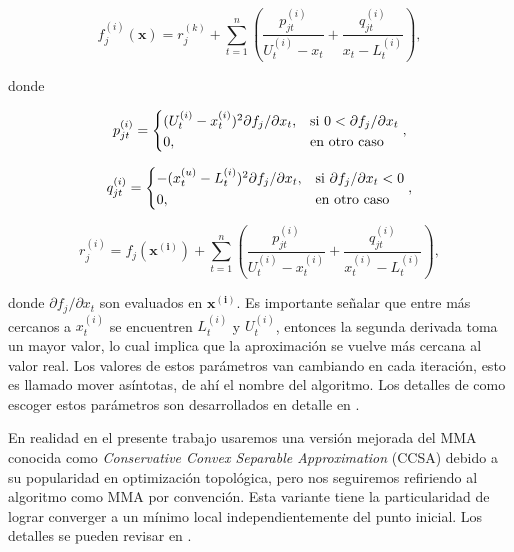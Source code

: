 \begin{equation}
  f_j^{(i)}(\boldsymbol{x}) = r_j^{(k)} + \displaystyle\sum_{t=1}^n\left(\frac{p_{jt}^{(i)}}{U_t^{(i)} - x_t}
  + \frac{q_{jt}^{(i)}}{x_t - L_t^{(i)}} \right),
\end{equation}

donde

\begin{equation}
  p_{jt}^{(i)} = \begin{cases*}
    (U_t^{(i)} - x_t^{(i)})^2 \partial f_j / \partial x_t, & si $0 < \partial f_j / \partial x_t$\\
    0, & en otro caso
  \end{cases*},
\end{equation}

\begin{equation}
  q_{jt}^{(i)} = \begin{cases*}
    -(x_t^{(u)} - L_t^{(i)})^2 \partial f_j / \partial x_t, & si $\partial f_j / \partial x_t < 0$\\
    0, & en otro caso
  \end{cases*},
\end{equation}


\begin{equation}
  r_j^{(i)} =  f_j(\boldsymbol{x^{(i)}}) + \displaystyle\sum_{t=1}^n\left(\frac{p_{jt}^{(i)}}{U_t^{(i)} - x_t^{(i)}}
  + \frac{q_{jt}^{(i)}}{x_t^{(i)} - L_t^{(i)}} \right),
\end{equation}

\noindent donde $\partial f_j / \partial x_t$ son evaluados en $\boldsymbol{x^{(i)}}$.
Es importante señalar que entre más cercanos a $x_t^{(i)}$ se encuentren $L_t^{(i)}$ y $U_t^{(i)}$,
entonces la segunda derivada toma un mayor valor, lo cual implica que la aproximación se vuelve más 
cercana al valor real. 
Los valores de estos parámetros van cambiando en cada iteración, esto es llamado mover asíntotas, de ahí el
nombre del algoritmo. Los detalles de como escoger estos parámetros son desarrollados en detalle
en \cite{Svanberg1987}.


En realidad en el presente trabajo usaremos una versión mejorada del MMA
conocida como \emph{Conservative Convex Separable Approximation} (CCSA) 
debido a su popularidad en optimización topológica, pero nos seguiremos refiriendo
al algoritmo como MMA por convención.
Esta variante tiene la particularidad de lograr converger a un mínimo local independientemente
del punto inicial. Los detalles se pueden revisar en \cite{Svanberg2002}.

